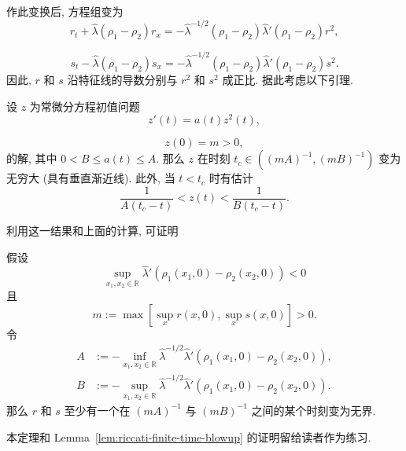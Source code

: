 作此变换后, 方程组变为
\begin{equation}\label{eq:p-system-weighted-first-slope}
r_t+\hat\lambda(\rho_1-\rho_2)r_x=-\hat\lambda^{-1/2}(\rho_1-\rho_2)\hat\lambda'(\rho_1-\rho_2)r^2,
\end{equation}

\begin{equation}\label{eq:p-system-weighted-second-slope}
s_t-\hat\lambda(\rho_1-\rho_2)s_x=-\hat\lambda^{-1/2}(\rho_1-\rho_2)\hat\lambda'(\rho_1-\rho_2)s^2.
\end{equation}
因此, $r$ 和 $s$ 沿特征线的导数分别与 $r^2$ 和 $s^2$ 成正比. 据此考虑以下引理.

\begin{Lemma}
\label{lem:riccati-finite-time-blowup}
设 $z$ 为常微分方程初值问题
\begin{equation}\label{eq:riccati-positive-coefficient}
z'(t)=a(t)z^2(t),
\end{equation}

\begin{equation}\label{eq:riccati-positive-initial-value}
z(0)=m>0,
\end{equation}
的解, 其中 $0<B\leq a(t)\leq A$. 那么 $z$ 在时刻 $t_c\in((mA)^{-1},(mB)^{-1})$ 变为无穷大 (具有垂直渐近线). 此外, 当 $t<t_c$ 时有估计
\begin{equation}\label{eq:riccati-blowup-bounds}
\dfrac1{A(t_c-t)}<z(t)<\dfrac1{B(t_c-t)}.
\end{equation}

\end{Lemma}

利用这一结果和上面的计算, 可证明

\begin{Theorem}
\label{thm:p-system-finite-time-blowup}
假设
\[
\sup_{x_1,x_2\in\mathbb{R}}\hat\lambda'(\rho_1(x_1,0)-\rho_2(x_2,0))<0
\]
且
\[
m:=\max[\sup_xr(x,0),\sup_xs(x,0)]>0.
\]
令
\[
\begin{aligned}
A&:=-\inf_{x_1,x_2\in\mathbb{R}}\hat\lambda^{-1/2}\hat\lambda'(\rho_1(x_1,0)-\rho_2(x_2,0)),\\
B&:=-\sup_{x_1,x_2\in\mathbb{R}}\hat\lambda^{-1/2}\hat\lambda'(\rho_1(x_1,0)-\rho_2(x_2,0)).
\end{aligned}
\]
那么 $r$ 和 $s$ 至少有一个在 $(mA)^{-1}$ 与 $(mB)^{-1}$ 之间的某个时刻变为无界.
\end{Theorem}

本定理和 Lemma~\ref{lem:riccati-finite-time-blowup} 的证明留给读者作为练习.
